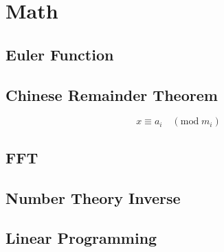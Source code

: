 \section{Math}
\subsection{Euler Function}


\subsection{Chinese Remainder Theorem}
\[
	x \equiv a_i \quad (\mathrm{mod}\;m_i)
\]


\subsection{FFT}


\subsection{Number Theory Inverse}


\subsection{Linear Programming}

